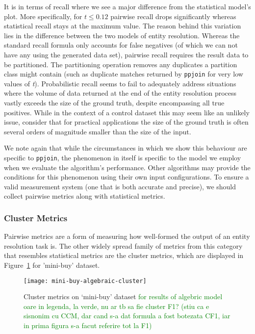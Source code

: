 It is in terms of recall where we see a major difference from the statistical
model's plot.
More specifically, for $t \le 0.12$ pairwise recall drops significantly whereas
statistical recall stays at the maximum value.
The reason behind this variation lies in the difference between the two models of entity
resolution.
Whereas the standard recall formula only accounts for false negatives (of which
we can not have any using the generated data set), pairwise recall requires the
result data to be partitioned.
The partitioning operation removes any duplicates a partition class might
contain (such as duplicate matches returned by \texttt{ppjoin} for very low
values of \textit{t}).
Probabilistic recall seems to fail to adequately address situations where the
volume of data returned at the end of the entity resolution process vastly
exceeds the size of the ground truth, despite encompassing all true positives.
While in the context of a control dataset this may seem like an unlikely issue,
consider that for practical applications the size of the ground truth is often
several orders of magnitude smaller than the size of the input.

We note again that while the circumstances in which we show this behaviour are
specific to \texttt{ppjoin}, the phenomenon in itself is specific to the model
we employ when we evaluate the algorithm's performance.
Other algorithms may provide the conditions for this phenomenon using their own
input configurations.
To ensure a valid measurement system (one that is both accurate and precise), we
should collect pairwise metrics along with statistical metrics.

\subsubsection{Cluster Metrics}

Pairwise metrics are a form of measuring how well-formed the output of an entity
resolution task is.
The other widely spread family of metrics from this category that resembles
statistical metrics are the cluster metrics, which are displayed in
Figure~\ref{fig:mini-alg-cluster} for 'mini-buy' dataset.

\begin{figure}[!h]
    \centering
    \captionsetup{justification=centering}
    \texttt{[image: mini-buy-algebraic-cluster]}
    \caption{Cluster metrics on `mini-buy' dataset 
    \textcolor{green}{for results of algebric model}\\
    \textcolor{green}{oare in legenda, la verde, nu ar tb sa fie cluster F1? (stiu ca e sisnonim cu CCM, dar cand s-a dat formula a fost botezata CF1, iar in prima figura s-a facut referire tot la F1)}
    }
    \label{fig:mini-alg-cluster}
\end{figure}

